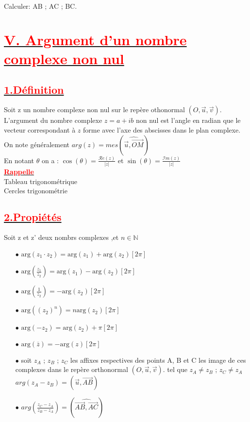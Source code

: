 \documentclass[12pt]{article}
\begin{document}
Calculer: AB ; AC ; BC.

\section*{\underline{\textbf{\textcolor{red}{V. Argument d'un nombre complexe non nul }}}}
\subsection*{\underline{\textbf{\textcolor{red}{1.Définition}}}}
Soit z un nombre complexe non nul sur le repère othonormal $(O,\vec{u},\vec{v})$. L'argument du nombre complexe $z = a + ib$ non nul est l'angle en radian que le vecteur correspondant à $z$ forme avec l'axe des abscisses dans le plan complexe.\\ On note généralement $arg(z)=mes(\widehat{\vec{u},\vec{OM}})$\\
En notant $\theta$ on a : $\cos(\theta)=\frac{\mathcal{R}e(z)}{|z|}$ et 
$\sin(\theta)=\frac{\mathcal{I}m(z)}{|z|}$\\
\underline{\textbf{\textcolor{red}{Rappelle}}}\\
Tableau trigonométrique\\
Cercles trigonométrie\\
\subsection*{\underline{\textbf{\textcolor{red}{2.Propiétés}}}}
Soit z et z' deux nombrs complexes ,et $n\in \mathbb{N}$\\
\begin{itemize}
\item[$\bullet$] $\text{{arg}}(z_1 \cdot z_2) = \text{{arg}}(z_1) + \text{{arg}}(z_2)[2\pi]$\\
\item[$\bullet$] $\text{{arg}}(\frac{z_1}{z_2}) = \text{{arg}}(z_1) - \text{{arg}}(z_2)[2\pi]$\\
\item[$\bullet$] $\text{{arg}}(\frac{1}{z_2}) = - \text{{arg}}(z_2)[2\pi]$\\
\item[$\bullet$] $\text{{arg}}((z_2)^{n}) = n\text{{arg}}(z_2)[2\pi]$\\
\item[$\bullet$] $\text{{arg}}(-z_2) = \text{{arg}}(z_2)+\pi[2\pi]$\\
\item[$\bullet$] $\text{{arg}}(\overline{z}) = -\text{{arg}}(z)[2\pi]$\\
\item[$\bullet$] soit $z_A$ ; $z_B$ ; $z_C$ les affixes respectives des points A, B et C les image de ces complexes dans le repère orthonormal $(O,\vec{u},\vec{v})$. tel que $z_A \neq z_B$ ; 
$z_C \neq z_A$ $arg(z_A-z_B)=(\vec{u},\vec{AB})$
\item[$\bullet$] $arg(\frac{z_C-z_A}{z_B-z_A})=(\widehat{\vec{AB},\vec{AC}})$
\end{itemize}
\end{document}
